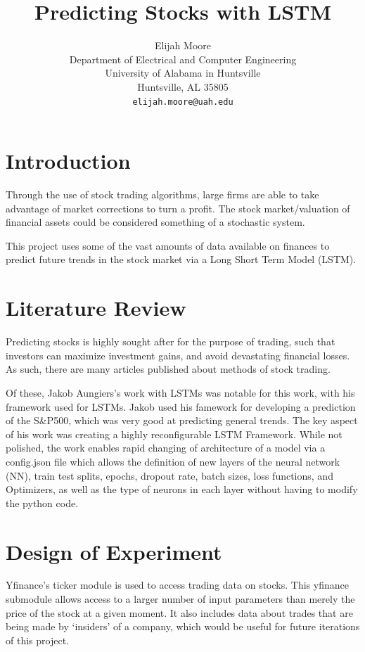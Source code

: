 \documentclass{article}
\title{Predicting Stocks with LSTM}
\author{%
  Elijah Moore \\
  Department of Electrical and Computer Engineering\\
  University of Alabama in Huntsville\\
  Huntsville, AL 35805 \\
  \texttt{elijah.moore@uah.edu} \\
}
\begin{document}
\maketitle


\begin{abstract}
  
\end{abstract}

\section{Introduction}

    Through the use of stock trading algorithms, large firms are able to take advantage of market corrections
    to turn a profit. The stock market/valuation of financial assets could be considered something of a stochastic system.
   
    This project uses some of the vast amounts of data available on finances to
    predict future trends in the stock market via a Long Short Term Model (LSTM).

\section{Literature Review}

    Predicting stocks is highly sought after for the purpose of trading, such that investors can maximize investment gains,
    and avoid devastating financial losses. As such, there are many articles published about methods of stock trading.

    Of these, Jakob Aungiers's work with LSTMs was notable for this work, with his framework used for LSTMs.
    Jakob used his famework for developing a prediction of the S\&P500, which was very good at predicting general trends.
    The key aspect of his work was creating a highly reconfigurable LSTM Framework. While not polished, the work enables rapid 
    changing of architecture of a model via a config.json file which allows the definition of new layers of the 
    neural network (NN), train test splits, epochs, dropout rate, batch sizes, loss functions, and Optimizers, 
    as well as the type of neurons in each layer without having to modify the python code.

\section{Design of Experiment}
    Yfinance's ticker module is used to access trading data on stocks.
    This yfinance submodule allows access to a larger number of input parameters than merely the price of the stock at a given moment.
    It also includes data about trades that are being made by `insiders' of a company, which would be useful for future iterations of this project.
\end{document}
